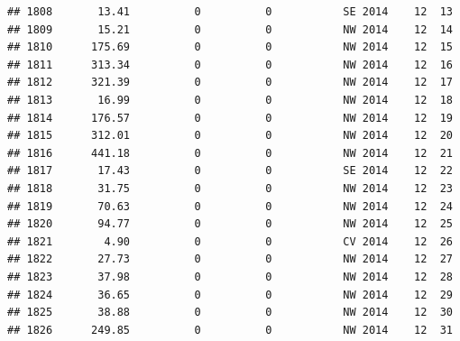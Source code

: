 \documentclass[
]{article}
\begin{document}
\begin{verbatim}
## 1808       13.41          0          0           SE 2014    12  13
## 1809       15.21          0          0           NW 2014    12  14
## 1810      175.69          0          0           NW 2014    12  15
## 1811      313.34          0          0           NW 2014    12  16
## 1812      321.39          0          0           NW 2014    12  17
## 1813       16.99          0          0           NW 2014    12  18
## 1814      176.57          0          0           NW 2014    12  19
## 1815      312.01          0          0           NW 2014    12  20
## 1816      441.18          0          0           NW 2014    12  21
## 1817       17.43          0          0           SE 2014    12  22
## 1818       31.75          0          0           NW 2014    12  23
## 1819       70.63          0          0           NW 2014    12  24
## 1820       94.77          0          0           NW 2014    12  25
## 1821        4.90          0          0           CV 2014    12  26
## 1822       27.73          0          0           NW 2014    12  27
## 1823       37.98          0          0           NW 2014    12  28
## 1824       36.65          0          0           NW 2014    12  29
## 1825       38.88          0          0           NW 2014    12  30
## 1826      249.85          0          0           NW 2014    12  31
\end{verbatim}
\end{document}
